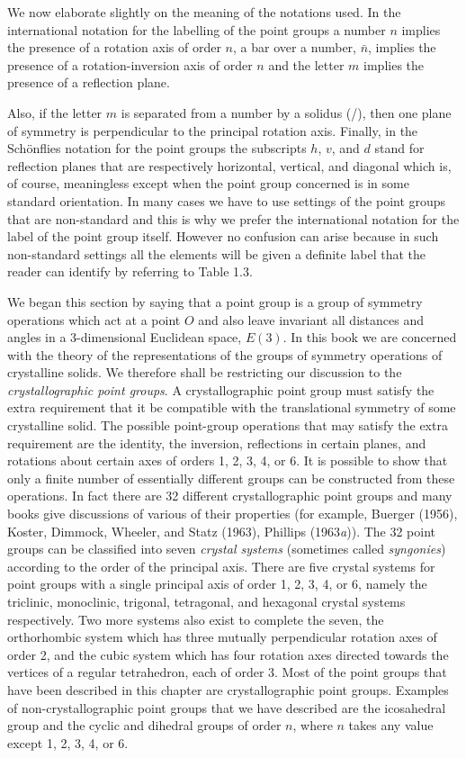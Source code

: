 \documentclass[11pt,a4paper,twoside,openright]{book}
\begin{document}
We now elaborate slightly on the meaning of the notations used. In the international notation for the labelling of the point groups a number $n$ implies the presence of a rotation axis of order $n$, a bar over a number, $\bar{n}$, implies the presence of a rotation-inversion axis of order $n$ and the letter $m$ implies the presence of a reflection plane.

Also, if the letter $m$ is separated from a number by a solidus (/), then one plane of symmetry is perpendicular to the principal rotation axis. Finally, in the Schönflies notation for the point groups the subscripts $h$, $v$, and $d$ stand for reflection planes that are respectively horizontal, vertical, and diagonal which is, of course, meaningless except when the point group concerned is in some standard orientation. In many cases we have to use settings of the point groups that are non-standard and this is why we prefer the international notation for the label of the point group itself. However no confusion can arise because in such non-standard settings all the elements will be given a definite label that the reader can identify by referring to Table 1.3.

We began this section by saying that a point group is a group of symmetry operations which act at a point $O$ and also leave invariant all distances and angles in a 3-dimensional Euclidean space, $E(3)$. In this book we are concerned with the theory of the representations of the groups of symmetry operations of crystalline solids. We therefore shall be restricting our discussion to the \textit{crystallographic point groups}. A crystallographic point group must satisfy the extra requirement that it be compatible with the translational symmetry of some crystalline solid. The possible point-group operations that may satisfy the extra requirement are the identity, the inversion, reflections in certain planes, and rotations about certain axes of orders 1, 2, 3, 4, or 6. It is possible to show that only a finite number of essentially different groups can be constructed from these operations. In fact there are 32 different crystallographic point groups and many books give discussions of various of their properties (for example, Buerger (1956), Koster, Dimmock, Wheeler, and Statz (1963), Phillips (1963\textit{a})). The 32 point groups can be classified into seven \textit{crystal systems} (sometimes called \textit{syngonies}) according to the order of the principal axis. There are five crystal systems for point groups with a single principal axis of order 1, 2, 3, 4, or 6, namely the triclinic, monoclinic, trigonal, tetragonal, and hexagonal crystal systems respectively. Two more systems also exist to complete the seven, the orthorhombic system which has three mutually perpendicular rotation axes of order 2, and the cubic system which has four rotation axes directed towards the vertices of a regular tetrahedron, each of order 3. Most of the point groups that have been described in this chapter are crystallographic point groups. Examples of non-crystallographic point groups that we have described are the icosahedral group and the cyclic and dihedral groups of order $n$, where $n$ takes any value except 1, 2, 3, 4, or 6.
\end{document}
